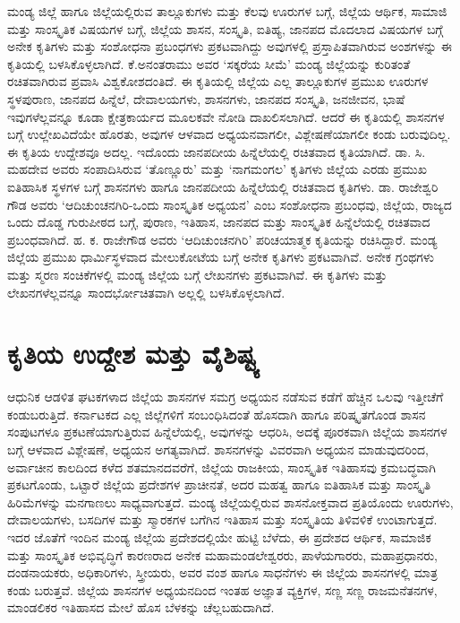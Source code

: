 ಮಂಡ್ಯ ಜಿಲ್ಲೆ ಹಾಗೂ ಜಿಲ್ಲೆಯಲ್ಲಿರುವ ತಾಲ್ಲೂಕುಗಳು ಮತ್ತು ಕೆಲವು ಊರುಗಳ ಬಗ್ಗೆ, ಜಿಲ್ಲೆಯ ಆರ್ಥಿಕ, ಸಾಮಾಜಿ ಮತ್ತು ಸಾಂಸ್ಕೃತಿಕ ವಿಷಯಗಳ ಬಗ್ಗೆ, ಜಿಲ್ಲೆಯ ಶಾಸನ, ಸಂಸ್ಕೃತಿ, ಐತಿಹ್ಯ, ಜಾನಪದ ಮೊದಲಾದ ವಿಷಯಗಳ ಬಗ್ಗೆ ಅನೇಕ ಕೃತಿಗಳು ಮತ್ತು ಸಂಶೋಧನಾ ಪ್ರಬಂಧಗಳು ಪ್ರಕಟವಾಗಿದ್ದು ಅವುಗಳಲ್ಲಿ ಪ್ರಸ್ತಾಪಿತವಾಗಿರುವ ಅಂಶಗಳನ್ನು ಈ ಕೃತಿಯಲ್ಲಿ ಬಳಸಿಕೊಳ್ಳಲಾಗಿದೆ. ಕೆ.ಅನಂತರಾಮು ಅವರ ‘ಸಕ್ಕರೆಯ ಸೀಮೆ’ ಮಂಡ್ಯ ಜಿಲ್ಲೆಯನ್ನು ಕುರಿತಂತೆ ರಚಿತವಾಗಿರುವ ಪ್ರವಾಸಿ ವಿಶ್ವಕೋಶದಂತಿದೆ. ಈ ಕೃತಿಯಲ್ಲಿ ಜಿಲ್ಲೆಯ ಎಲ್ಲ ತಾಲ್ಲೂಕುಗಳ ಪ್ರಮುಖ ಊರುಗಳ ಸ್ಥಳಪುರಾಣ, ಜಾನಪದ ಹಿನ್ನೆಲೆ, ದೇವಾಲಯಗಳು, ಶಾಸನಗಳು, ಜಾನಪದ ಸಂಸ್ಕೃತಿ, ಜನಜೀವನ, ಭಾಷೆ ಇವುಗಳೆಲ್ಲವನ್ನೂ ಕೂಡಾ ಕ್ಷೇತ್ರಕಾರ್ಯದ ಮೂಲಕವೇ ನೋಡಿ ದಾಖಲಿಸಲಾಗಿದೆ. ಆದರೆ ಈ ಕೃತಿಯಲ್ಲಿ ಶಾಸನಗಳ ಬಗ್ಗೆ ಉಲ್ಲೇಖವಿದೆಯೇ ಹೊರತು, ಅವುಗಳ ಆಳವಾದ ಅಧ್ಯಯನವಾಗಲೀ, ವಿಶ್ಲೇಷಣೆಯಾಗಲೀ ಕಂಡು ಬರುವುದಿಲ್ಲ. ಈ ಕೃತಿಯ ಉದ್ದೇಶವೂ ಅದಲ್ಲ. ಇದೊಂದು ಜಾನಪದೀಯ ಹಿನ್ನೆಲೆಯಲ್ಲಿ ರಚಿತವಾದ ಕೃತಿಯಾಗಿದೆ. ಡಾ. ಸಿ. ಮಹದೇವ ಅವರು ಸಂಪಾದಿಸಿರುವ ‘ತೊಣ್ಣೂರು’ ಮತ್ತು ‘ನಾಗಮಂಗಲ’ ಕೃತಿಗಳು ಜಿಲ್ಲೆಯ ಎರಡು ಪ್ರಮುಖ ಐತಿಹಾಸಿಕ ಸ್ಥಳಗಳ ಬಗ್ಗೆ ಶಾಸನಗಳು ಹಾಗೂ ಜಾನಪದೀಯ ಹಿನ್ನೆಲೆಯಲ್ಲಿ ರಚಿತವಾದ ಕೃತಿಗಳು. ಡಾ. ರಾಜೇಶ್ವರಿ ಗೌಡ ಅವರು ‘ಆದಿಚುಂಚನಗಿರಿ-ಒಂದು ಸಾಂಸ್ಕೃತಿಕ ಅಧ್ಯಯನ’ ಎಂಬ ಸಂಶೋಧನಾ ಪ್ರಬಂಧವು, ಜಿಲ್ಲೆಯ, ರಾಜ್ಯದ ಒಂದು ದೊಡ್ಡ ಗುರುಪೀಠದ ಬಗ್ಗೆ, ಪುರಾಣ, ಇತಿಹಾಸ, ಜಾನಪದ ಮತ್ತು ಸಾಂಸ್ಕೃತಿಕ ಹಿನ್ನೆಲೆಯಲ್ಲಿ ರಚಿತವಾದ ಪ್ರಬಂಧವಾಗಿದೆ. ಹ. ಕ. ರಾಜೇಗೌಡ ಅವರು ‘ಆದಿಚುಂಚನಗಿರಿ’ ಪರಿಚಯಾತ್ಮಕ ಕೃತಿಯನ್ನು ರಚಿಸಿದ್ದಾರೆ. ಮಂಡ್ಯ ಜಿಲ್ಲೆಯ ಪ್ರಮುಖ ಧಾರ್ಮಿಸ್ಥಳವಾದ ಮೇಲುಕೋಟೆಯ ಬಗ್ಗೆ ಅನೇಕ ಕೃತಿಗಳು ಪ್ರಕಟವಾಗಿವೆ. ಅನೇಕ ಗ್ರಂಥಗಳು ಮತ್ತು ಸ್ಮರಣ ಸಂಚಿಕೆಗಳಲ್ಲಿ ಮಂಡ್ಯ ಜಿಲ್ಲೆಯ ಬಗ್ಗೆ ಲೇಖನಗಳು ಪ್ರಕಟವಾಗಿವೆ. ಈ ಕೃತಿಗಳು ಮತ್ತು ಲೇಖನಗಳೆಲ್ಲವನ್ನೂ ಸಾಂದರ್ಭೋಚಿತವಾಗಿ ಅಲ್ಲಲ್ಲಿ ಬಳಸಿಕೊಳ್ಳಲಾಗಿದೆ.


\section*{ಕೃತಿಯ ಉದ್ದೇಶ ಮತ್ತು ವೈಶಿಷ್ಟ್ಯ}

ಆಧುನಿಕ ಆಡಳಿತ ಘಟಕಗಳಾದ ಜಿಲ್ಲೆಯ ಶಾಸನಗಳ ಸಮಗ್ರ ಅಧ್ಯಯನ ನಡೆಸುವ ಕಡೆಗೆ ಹೆಚ್ಚಿನ ಒಲವು ಇತ್ತೀಚೆಗೆ ಕಂಡುಬರುತ್ತಿದೆ. ಕರ್ನಾಟಕದ ಎಲ್ಲ ಜಿಲ್ಲೆಗಳಿಗೆ ಸಂಬಂಧಿಸಿದಂತೆ ಹೊಸದಾಗಿ ಹಾಗೂ ಪರಿಷ್ಕೃತಗೊಂಡ ಶಾಸನ ಸಂಪುಟಗಳೂ ಪ್ರಕಟಣೆಯಾಗುತ್ತಿರುವ ಹಿನ್ನೆಲೆಯಲ್ಲಿ, ಅವುಗಳನ್ನು ಆಧರಿಸಿ, ಅದಕ್ಕೆ ಪೂರಕವಾಗಿ ಜಿಲ್ಲೆಯ ಶಾಸನಗಳ ಬಗ್ಗೆ ಆಳವಾದ ವಿಶ್ಲೇಷಣೆ, ಅಧ್ಯಯನ ಅಗತ್ಯವಾಗಿದೆ. ಶಾಸನಗಳನ್ನು ವಿವರವಾಗಿ ಅಧ್ಯಯನ ಮಾಡುವುದರಿಂದ, ಅರ್ವಾಚೀನ ಕಾಲದಿಂದ ಕಳೆದ ಶತಮಾನದವರೆಗೆ, ಜಿಲ್ಲೆಯ ರಾಜಕೀಯ, ಸಾಂಸ್ಕೃತಿಕ ಇತಿಹಾಸವು ಕ್ರಮಬದ್ಧವಾಗಿ ಪ್ರಕಟಗೊಂಡು, ಒಟ್ಟಾರೆ ಜಿಲ್ಲೆಯ ಪ್ರದೇಶಗಳ ಪ್ರಾಚೀನತೆ, ಅದರ ಮಹತ್ವ ಹಾಗೂ ಐತಿಹಾಸಿಕ ಮತ್ತು ಸಾಂಸ್ಕೃತಿ ಹಿರಿಮೆಗಳನ್ನು ಮನಗಾಣಲು ಸಾಧ್ಯವಾಗುತ್ತದೆ. ಮಂಡ್ಯ ಜಿಲ್ಲೆಯಲ್ಲಿರುವ ಶಾಸನೋಕ್ತವಾದ ಪ್ರತಿಯೊಂದು ಊರುಗಳು, ದೇವಾಲಯಗಳು, ಬಸದಿಗಳ ಮತ್ತು ಸ್ಮಾರಕಗಳ ಬಗೆಗಿನ ಇತಿಹಾಸ ಮತ್ತು ಸಂಸ್ಕೃತಿಯ ತಿಳಿವಳಿಕೆ ಉಂಟಾಗುತ್ತದೆ. ಇದರ ಜೊತೆಗೆ ಇಂದಿನ ಮಂಡ್ಯ ಜಿಲ್ಲೆಯ ಪ್ರದೇಶದಲ್ಲಿಯೇ ಹುಟ್ಟಿ ಬೆಳೆದು, ಈ ಪ್ರದೇಶದ ಆರ್ಥಿಕ, ಸಾಮಾಜಿಕ ಮತ್ತು ಸಾಂಸ್ಕೃತಿಕ ಅಭಿವೃದ್ಧಿಗೆ ಕಾರಣರಾದ ಅನೇಕ ಮಹಾಮಂಡಲೇಶ್ವರರು, ಪಾಳೆಯಗಾರರು, ಮಹಾಪ್ರಧಾನರು, ದಂಡನಾಯಕರು, ಅಧಿಕಾರಿಗಳು, ಸ್ತ್ರೀಯರು, ಅವರ ವಂಶ ಹಾಗೂ ಸಾಧನೆಗಳು ಈ ಜಿಲ್ಲೆಯ ಶಾಸನಗಳಲ್ಲಿ ಮಾತ್ರ ಕಂಡು ಬರುತ್ತವೆ. ಜಿಲ್ಲೆಯ ಶಾಸನಗಳ ಅಧ್ಯಯನದಿಂದ ಇಂತಹ ಅಜ್ಞಾತ ವ್ಯಕ್ತಿಗಳ, ಸಣ್ಣ ಸಣ್ಣ ರಾಜಮನೆತನಗಳ, ಮಾಂಡಲಿಕರ ಇತಿಹಾಸದ ಮೇಲೆ ಹೊಸ ಬೆಳಕನ್ನು ಚೆಲ್ಲಬಹುದಾಗಿದೆ.

